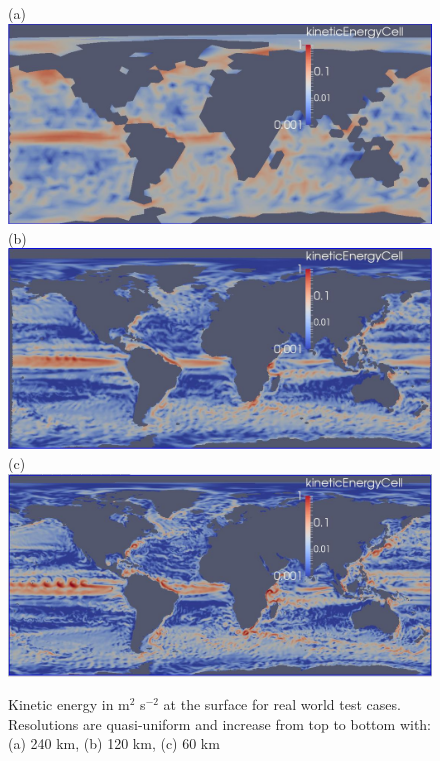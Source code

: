 \begin{figure}[H!]
	\centering
(a)\includegraphics[scale=0.36]{ocean/figures/m72m_240km_yr11_k1_ke.jpg}\\
(b)\includegraphics[scale=0.36]{ocean/figures/m72g_120km_yr11_k1_ke.jpg}\\
(c)\includegraphics[scale=0.36]{ocean/figures/m72h_60km_yr11_k1_ke.jpg}
\caption{Kinetic energy in m$^2$ s$^{-2}$ at the surface for real world test cases.  Resolutions are quasi-uniform and increase from top to bottom with: (a) 240 km, (b) 120 km, (c) 60 km} 
	\label{fig:real_world_ke1}
\end{figure}


